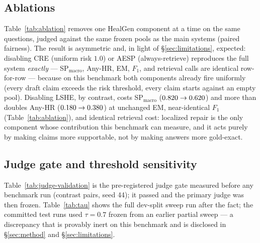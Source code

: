 \subsection{Ablations}
Table~\ref{tab:ablation} removes one HealGen component at a time on the
same questions, judged against the same frozen pools as the main systems
(paired fairness).  The result is asymmetric and, in light of
\S\ref{sec:limitations}, expected: disabling CRE (uniform risk $1.0$)
or AESP (always-retrieve) reproduces the full system \emph{exactly} ---
SP$_{\text{macro}}$, Any-HR, EM, $F_1$, and retrieval calls are
identical row-for-row --- because on this benchmark both components
already fire uniformly (every draft claim exceeds the risk threshold,
every claim starts against an empty pool).  Disabling LSHE, by contrast,
costs \SPDropLSHE{} SP$_{\text{macro}}$
($0.820 \rightarrow 0.620$) and more
than doubles Any-HR ($0.180 \rightarrow 0.380$) at
unchanged EM, near-identical $F_1$ (Table~\ref{tab:ablation}), and
identical retrieval cost: localized repair is
the only component
whose contribution this benchmark can measure, and it acts purely by
making claims more supportable, not by making answers more
gold-exact.

\begin{table}[t]
\centering
\caption{Ablations on the same $\NTest$ questions and frozen pools.
Any-HR is the fraction of answers with at least one unsupported claim.}
\label{tab:ablation}
\resizebox{\columnwidth}{!}{}
\end{table}

\subsection{Judge gate and threshold sensitivity}
Table~\ref{tab:judge-validation} is the pre-registered judge gate
measured before any benchmark run (contrast pairs, seed 44); it passed
and the primary judge was then frozen.  Table~\ref{tab:tau} shows the
full dev-split sweep run after the fact; the committed test runs used
$\tau{=}0.7$ frozen from an earlier partial sweep --- a discrepancy
that is provably inert on this benchmark and is disclosed in
\S\ref{sec:method} and \S\ref{sec:limitations}.

\begin{table}[t]
\centering
\caption{Judge validation gate on 100 labeled contrast pairs (gold vs.\
hallucinated answers), measured at $T{=}1$ before the benchmark ran.}
\label{tab:judge-validation}
\resizebox{\columnwidth}{!}{}
\end{table}

